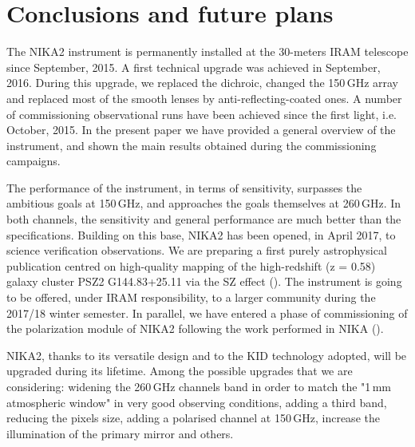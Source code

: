 \documentclass[]{aa} %
\begin{document}
%
%





\section{Conclusions and future plans}

The NIKA2 instrument is permanently installed at the 30-meters IRAM telescope since September, 2015. A first technical upgrade was achieved in September, 2016. During this upgrade, we replaced the dichroic, changed the 150\,GHz array and replaced most of the smooth lenses by anti-reflecting-coated ones. A number of commissioning observational runs have been achieved since the first light, i.e. October, 2015. In the present paper we have provided a general overview of the instrument, and shown the main results obtained during the commissioning campaigns. 

The performance of the instrument, in terms of sensitivity, surpasses the ambitious goals at 150\,GHz, and approaches the goals themselves at 260\,GHz. In both channels, the sensitivity and general performance are much better than the specifications. 
Building on this base, NIKA2 has been opened, in April 2017, to science verification observations. We are preparing a first purely astrophysical publication centred on high-quality mapping of the high-redshift (z = 0.58) galaxy cluster PSZ2 G144.83+25.11 via the SZ effect (\cite{Ruppin2017}). The instrument is going to be offered, under IRAM responsibility, to a larger community during the 2017/18 winter semester. In parallel, we have entered a phase of commissioning of the polarization module of NIKA2 following the work performed in NIKA (\cite{Ritacco2017}). 

NIKA2, thanks to its versatile design and to the KID technology adopted, will be upgraded during its lifetime. Among the possible upgrades that we are considering: widening the 260\,GHz channels band in order to match the "1\,mm atmospheric window" in very good observing conditions, adding a third band, reducing the pixels size, adding a polarised channel at 150\,GHz, increase the illumination of the primary mirror and others. 
\end{document}
